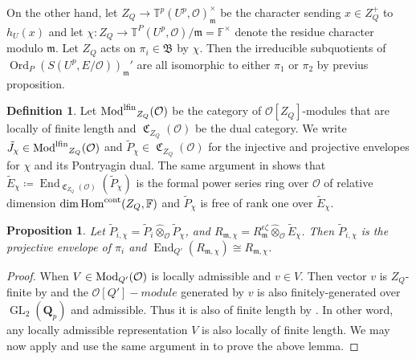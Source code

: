 \documentclass[leqno]{amsart}
\newtheorem{prop}[thm]{Proposition}
\theoremstyle{definition}
\newtheorem{defn}[thm]{Definition}
\theoremstyle{remark}
\newcommand{\oo}{\mathcal{O}}
\newcommand{\fF}{\mathbb{F}} %
\newcommand{\Qp}{\mathbf{Q}_p}
\DeclareMathOperator{\End}{End}
\DeclareMathOperator{\Hom}{Hom}
\DeclareMathOperator{\GL}{GL}
\newcommand{\cont}{\textnormal{cont}}
\newcommand{\fm}{\mathfrak{m}}
\DeclareMathOperator{\Mod}{\textnormal{Mod}}
\DeclareMathOperator{\lfMod}{\textnormal{Mod}^{\textnormal{lfin}}}
\DeclareMathOperator{\fC}{\mathfrak{C}} %
\DeclareMathOperator{\Ord}{Ord} %
\newcommand{\B}{\mathfrak B} %
\newcommand{\TT}{\mathbb{T}} %
\begin{document}
On the other hand,
let $Z_Q\to \TT^p(U^p,\oo)_{\fm}^{\times}$
be the character
sending $x\in Z_Q^+$ to $h_U(x)$
and let 
$\chi\colon Z_Q\to \TT^P(U^p,\oo)/\fm=\fF^\times$
denote the residue character modulo $\fm$.
Let $Z_Q$ acts on $\pi_i\in \B$ by $\chi$.
Then the irreducible subquotients
of  $\Ord_P(S(U^p,E/\oo))_{\fm}'$
are all isomorphic to either $\pi_1$ or  $\pi_2$
by previus proposition.


\begin{defn}

Let $\lfMod_{Z_Q}(\oo)$
be the category of $\oo[Z_Q]$-modules
that are locally of finite length
and  $\fC_{Z_Q}(\oo)$ be the dual category.
We write 
$\tilde{J}_\chi\in \lfMod_{Z_Q}(\oo)$ and 
$\tilde{P}_\chi\in \fC_{Z_Q}(\oo)$
for the injective and projective envelopes
for $\chi$ and its Pontryagin dual.
The same argument in \cite[Prop 3.34]{pask}
shows that 
$\tilde{E}_\chi\coloneqq 
\End_{\fC_{Z_Q}(\oo)}(\tilde{P}_\chi)$
is the formal power series ring over $\oo$ 
of relative dimension $\dim\Hom^{\cont}(Z_Q,\fF)$
and $\tilde{P}_\chi$ is free of rank one over 
$\tilde{E}_\chi$.

\end{defn}


\begin{prop}\label{prop:envelope}
	Let $\tilde{P}_{i,\chi}=
	\tilde{P}_i\hat{\otimes}_{\oo}\tilde{P}_\chi$,
	and $R_{\fm, \chi}=R_\fm^{\epsilon\zeta}
	\hat{\otimes}_{\oo}\tilde{E}_\chi$.
	Then $\tilde{P}_{i,\chi}$
	is the projective envelope
	of $\pi_i$ and 
	$\End_{Q'}(R_{\fm, \chi}) \cong R_{\fm,\chi}$.
\end{prop}
\begin{proof}
	When $V\in \Mod_{Q'}(\oo)$
	is locally admissible and $v\in V$.
	Then  vector 
	$v$ is  $Z_Q$-finite by \cite[Lem 2.3.5]{emeI}
	and the $\oo[Q']-module$
	generated by $v$ is also 
	finitely-generated over  $\GL_2(\Qp)$
	and admissible.
	Thus it is also of finite length 
	by \cite[Thm 2.3.8]{emeI}.
	In other word,
	any locally admissible representation $V$
	is also locally of finite length.
	We may now apply \cite[Lem B.6]{GN}
	and use the same argument in \cite[Lem B.8]{GN}
	to prove the above lemma.
\end{proof}
\end{document}
